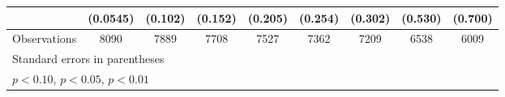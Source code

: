 \begin{table}[htbp]
\begin{tabular}{l*{8}{c}}
                    &    (0.0545)         &     (0.102)         &     (0.152)         &     (0.205)         &     (0.254)         &     (0.302)         &     (0.530)         &     (0.700)         \\
\hline
Observations        &        8090         &        7889         &        7708         &        7527         &        7362         &        7209         &        6538         &        6009         \\
\hline\hline
\multicolumn{9}{l}{\footnotesize Standard errors in parentheses}\\
\multicolumn{9}{l}{\footnotesize \sym{*} \(p<0.10\), \sym{**} \(p<0.05\), \sym{***} \(p<0.01\)}\\
\end{tabular}
\end{table}
